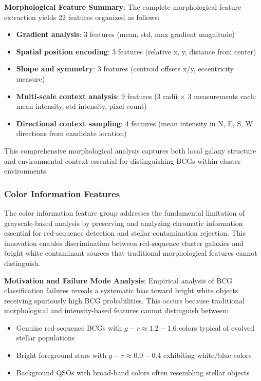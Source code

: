 \documentclass[twocolumn,10pt]{aastex631}
\begin{document}
\textbf{Morphological Feature Summary}: The complete morphological feature extraction yields 22 features organized as follows:

\begin{itemize}
\item \textbf{Gradient analysis}: 3 features (mean, std, max gradient magnitude)
\item \textbf{Spatial position encoding}: 3 features (relative x, y, distance from center)
\item \textbf{Shape and symmetry}: 3 features (centroid offsets x/y, eccentricity measure)
\item \textbf{Multi-scale context analysis}: 9 features (3 radii × 3 measurements each: mean intensity, std intensity, pixel count)
\item \textbf{Directional context sampling}: 4 features (mean intensity in N, E, S, W directions from candidate location)
\end{itemize}

This comprehensive morphological analysis captures both local galaxy structure and environmental context essential for distinguishing BCGs within cluster environments.

\subsubsection{Color Information Features}

The color information feature group addresses the fundamental limitation of grayscale-based analysis by preserving and analyzing chromatic information essential for red-sequence detection and stellar contamination rejection. This innovation enables discrimination between red-sequence cluster galaxies and bright white contaminant sources that traditional morphological features cannot distinguish.

\textbf{Motivation and Failure Mode Analysis}: Empirical analysis of BCG classification failures reveals a systematic bias toward bright white objects receiving spuriously high BCG probabilities. This occurs because traditional morphological and intensity-based features cannot distinguish between:
\begin{itemize}
\item Genuine red-sequence BCGs with $g-r \approx 1.2-1.6$ colors typical of evolved stellar populations \citep{Bell2004,Bruzual2003}
\item Bright foreground stars with $g-r \approx 0.0-0.4$ exhibiting white/blue colors
\item Background QSOs with broad-band colors often resembling stellar objects
\end{itemize}
\end{document}
